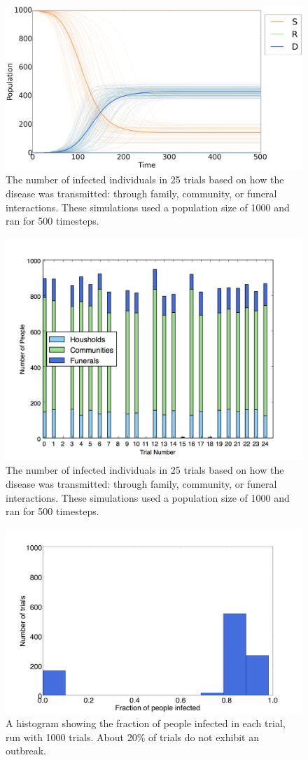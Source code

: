 \begin{figure}
  \centering
  \includegraphics[width=\textwidth]{average-time-series}
  \caption{The number of infected individuals in 25 trials based on how the disease was transmitted: through family, community, or funeral interactions. These simulations used a population size of 1000 and ran for 500 timesteps.}
\end{figure}

\begin{figure}
  \centering
  \includegraphics[width=.75\textwidth]{infecttypes}
  \caption{The number of infected individuals in 25 trials based on how the disease was transmitted: through family, community, or funeral interactions. These simulations used a population size of 1000 and ran for 500 timesteps.}
  \label{fig:infecttypes}
\end{figure}

\begin{figure}
  \centering
  \includegraphics[width=.75\textwidth]{Histogram-sabd}
  \caption{A histogram showing the fraction of people infected in each trial, run with 1000 trials. About 20\% of trials do not exhibit an outbreak.}
  \label{fig:hist-sabd}
\end{figure}